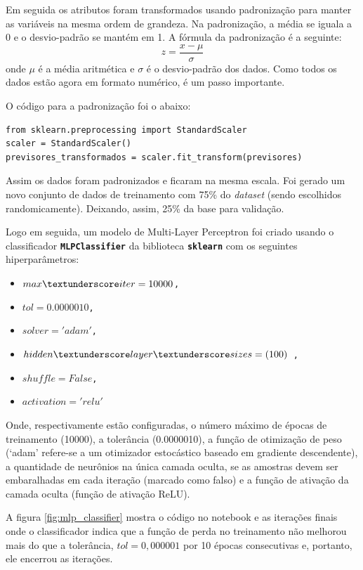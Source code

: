 Em seguida os atributos foram transformados usando padronização para manter as variáveis na mesma ordem de grandeza. Na padronização, a média se iguala a 0 e o desvio-padrão se mantém em 1. A fórmula da padronização é a seguinte:
\begin{equation}\label{padronizacao}
	z = \frac{x - \mu}{\sigma}
\end{equation}
onde $\mu$ é a média aritmética e $\sigma$ é o desvio-padrão dos dados. Como todos os dados estão agora em formato numérico, é um passo importante.

O código para a padronização foi o abaixo:
\begin{verbatim} 
from sklearn.preprocessing import StandardScaler
scaler = StandardScaler()
previsores_transformados = scaler.fit_transform(previsores)
\end{verbatim}
Assim os dados foram padronizados e ficaram na mesma escala. Foi gerado um novo conjunto de dados de treinamento com 75\% do \textit{dataset} (sendo escolhidos randomicamente). Deixando, assim, 25\% da base para validação.

Logo em seguida, um modelo de Multi-Layer Perceptron foi criado usando o classificador \texttt{\textbf{MLPClassifier}} da biblioteca \texttt{\textbf{sklearn}} com os seguintes hiperparâmetros: 
\begin{itemize}
	\item \texttt{$max\textunderscore iter=10000$,}
	\item \texttt{$tol = 0.0000010$,}
	\item \texttt{$solver = 'adam'$,}
	\item \texttt{$hidden\textunderscore layer\textunderscore sizes=(100)$ ,}
	\item \texttt{$shuffle=False$,}
	\item \texttt{$activation='relu'$}
\end{itemize}

Onde, respectivamente estão configuradas, o número máximo de épocas de treinamento (10000), a tolerância (0.0000010), a função de otimização de peso (`adam' refere-se a um otimizador estocástico baseado em gradiente descendente), a quantidade de neurônios na única camada oculta, se as amostras devem ser embaralhadas em cada iteração (marcado como falso) e a função de ativação da camada oculta (função de ativação ReLU).

A figura \ref{fig:mlp_classifier} mostra o código no notebook e as iterações finais onde o classificador indica que a função de perda no treinamento não melhorou mais do que a tolerância, $tol = 0,000001$ por 10 épocas consecutivas e, portanto, ele encerrou as iterações.

